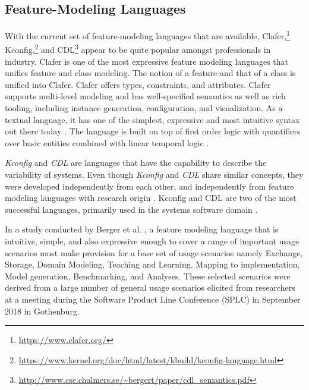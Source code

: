 \documentclass[conference]{IEEEtran}
\newcommand{\foot}[1]{\footnote{\url{#1}}}
\begin{document}
 \subsection{Feature-Modeling Languages}
With the current set of feature-modeling languages that
are available, Clafer,\foot{https://www.clafer.org/} Kconfig,\foot{https://www.kernel.org/doc/html/latest/kbuild/kconfig-language.html} and CDL\foot{http://www.cse.chalmers.se/~bergert/paper/cdl_semantics.pdf} appear to be quite popular amongst professionals in industry. Clafer is one of the most expressive feature modeling languages that unifies feature and class modeling. The notion of a feature and that of a class is unified into Clafer. Clafer offers types, constraints, and attributes. Clafer supports multi-level modeling and has well-specified semantics as well as rich tooling, including instance generation, configuration, and visualization. As a textual language, it has one of the simplest, expressive and most intuitive syntax out there today \cite{fmod-lang-scenarios}. The language is built on top of first order logic with quantifiers over basic entities combined with linear temporal logic \cite{clafer}.

\textit{Kconfig} and \textit{CDL} are languages that have the capability to describe the variability of systems. Even though \textit{Kconfig} and \textit{CDL} share similar concepts, they were developed independently from each other, and independently from feature modeling languages with research origin \cite{vmir}. Kconfig and CDL are two of the most successful languages, primarily used in the systems software domain \cite{fmod-lang-scenarios}. 

In a study conducted by Berger et al. \cite{fmod-lang-scenarios}, a feature modeling language that is intuitive, simple, and also expressive enough to cover a range of important usage scenarios must make provision for a base set of usage scenarios namely Exchange, Storage, Domain Modeling, Teaching and Learning, Mapping to implementation, Model generation, Benchmarking, and Analyses. These selected scenarios were derived from a large number of general usage scenarios elicited from researchers at a meeting during the Software Product Line Conference (SPLC) in September 2018 in Gothenburg.
\end{document}
